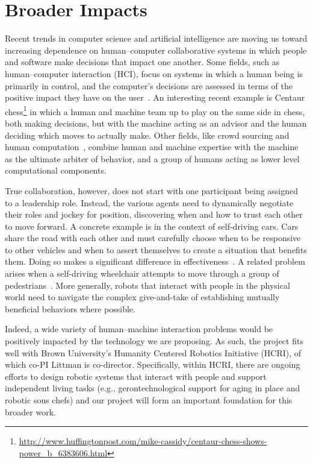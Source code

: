 
\section{Broader Impacts}

Recent trends in computer science and artificial intelligence are
moving us toward increasing dependence on human--computer
collaborative systems in which people and software make decisions that
impact one another.  Some fields, such as human--computer interaction
(HCI), focus on systems in which a human being is primarily in
control, and the computer's decisions are assessed in terms of the
positive impact they have on the user~\cite{maes1993learning}.  An
interesting recent example is Centaur
chess\footnote{\url{http://www.huffingtonpost.com/mike-cassidy/centaur-chess-shows-power_b_6383606.html}}
in which a human and machine team up to play on the same side in
chess, both making decisions, but with the machine acting as an
advisor and the human deciding which moves to actually make.  Other
fields, like crowd sourcing and human computation~\cite{von2009human},
combine human and machine expertise with the machine as the ultimate
arbiter of behavior, and a group of humans acting as lower level
computational components.

True collaboration, however, does not start with one participant being
assigned to a leadership role.  Instead, the various agents need to
dynamically negotiate their roles and jockey for position, discovering
when and how to trust each other to move forward.  A concrete example
is in the context of self-driving cars.  Cars share the road with each
other and must carefully choose when to be responsive to other
vehicles and when to assert themselves to create a situation that
benefits them.  Doing so makes a significant difference in
effectiveness~\cite{cunningham2015mpdm}.  A related problem arises
when a self-driving wheelchair attempts to move through a group of
pedestrians~\cite{kim2016socially}.  More generally, robots that
interact with people in the physical world need to navigate the
complex give-and-take of establishing mutually beneficial behaviors
where possible.

Indeed, a wide variety of human--machine interaction problems would be
positively impacted by the technology we are proposing.
%
As such, the project fits well with Brown University's Humanity
Centered Robotics Initiative (HCRI), of which co-PI Littman is
co-director.  Specifically, within HCRI, there are ongoing efforts to
design robotic systems that interact with people and support
independent living tasks (e.g., gerontechnological support for aging
in place and robotic sous chefs) and our project will form an
important foundation for this broader work.

